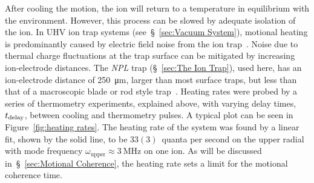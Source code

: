     After cooling the motion, the ion will return to a temperature in
    equilibrium with the environment. However, this process can be slowed by
    adequate isolation of the ion. In UHV ion trap systems (see~\S~\ref{sec:Vacuum System}), motional heating is predominantly caused
    by electric field noise from the ion trap~\cite{wineland_experimental_1998}.
    Noise due to thermal charge fluctuations at the trap surface can be 
    mitigated by increasing ion-electrode distances. The \emph{NPL} trap
    (\S~\ref{sec:The Ion Trap}), used here, has an ion-electrode 
    distance of 250~\unit{\um}, larger than most surface traps, but less than that of a
    macroscopic blade or rod style trap~\cite{milne_construction_2021}.
    Heating rates were probed by a series of thermometry experiments, explained
    above, with varying delay
    times, $t_{\rm delay}$, between cooling and thermometry pulses. A typical plot can be seen in
    Figure~\ref{fig:heating rates}. The heating rate of the system
    was found by a linear fit, shown by the solid line, to be $33(3)$~quanta
    per second on the upper radial with mode frequency $\omega_\mathrm{upper} \approx 3~\unit{\MHz}$ on
    one ion. As will be discussed in~\S~\ref{sec:Motional Coherence}, the heating rate sets a limit for the motional coherence time.



